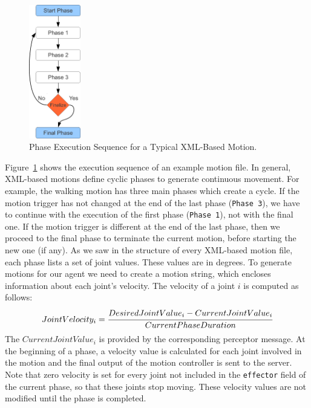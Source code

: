 \begin{figure}[t!]
\centering
  \includegraphics[width=0.2\textwidth]{Chapter3/figures/MotionSequence.pdf}
  \caption{Phase Execution Sequence for a Typical XML-Based Motion.}
  \label{fig:PhaseSequence}
\end{figure}


Figure~\ref{fig:PhaseSequence} shows the execution sequence of an example motion file. In general, XML-based motions define cyclic phases to generate continuous movement. For example, the walking motion has three main phases which create a cycle. If the motion trigger has not changed at the end of the last phase (\texttt{Phase 3}), we have to continue with the execution of the first phase (\texttt{Phase 1}), not with the final one. If the motion trigger is different at the end of the last phase, then we proceed to the final phase to terminate the current motion, before starting the new one (if any). As we saw in the structure of every XML-based motion file, each phase lists a set of joint values. These values are in degrees. To generate motions for our agent we need to create a motion string, which encloses information about each joint's velocity. The velocity of a joint $i$ is computed as follows:
\[
JointVelocity_i = \cfrac{DesiredJointValue_i - CurrentJointValue_i}{CurrentPhaseDuration}
\]
The $CurrentJointValue_i$ is provided by the corresponding perceptor message. 
At the beginning of a phase, a velocity value is calculated for each joint involved in the motion and the final output of the motion controller is sent to the server. Note that zero velocity is set for every joint not included in the \texttt{effector} field of the current phase, so that these joints stop moving. These velocity values are not modified until the phase is completed. 



